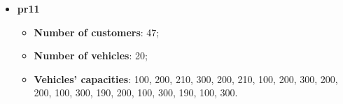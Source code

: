 \documentclass[../main.tex]{subfiles}
\begin{document}
\begin{itemize}
    \item \textbf{pr11}
        \begin{itemize}
            \item \textbf{Number of customers}: 47;
            \item \textbf{Number of vehicles}: 20;
            \item \textbf{Vehicles' capacities}: 100, 200, 210, 300, 200, 210, 100, 200, 300, 200, 200, 100, 300, 190, 200, 100, 300, 190, 100, 300.
        \end{itemize}

\end{itemize}
\end{document}
